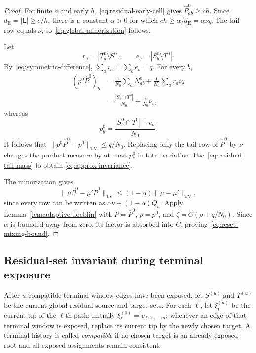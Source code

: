 \documentclass[11pt]{article}
\newcommand{\1}{\mathbf 1}
\newcommand{\TV}{\mathrm{TV}}
\theoremstyle{definition}
\theoremstyle{remark}
\begin{document}
\begin{proof}
For finite $a$ and early $b$,~\eqref{eq:residual-early-cell} gives
$\widehat P^0_{ab}\geq ch$.  Since
$d_{\mathrm E}=|\mathsf E|\geq c/h$, there is a constant $\alpha>0$ for
which $ch\geq\alpha/d_{\mathrm E}=\alpha\nu_b$.  The tail row equals
$\nu$, so~\eqref{eq:global-minorization} follows.

Let
\[
 r_a=|T_a^0\setminus S^0|,
 \qquad
 e_b=|S_b^0\setminus T^0|.
\]
By~\eqref{eq:symmetric-difference}, $\sum_ar_a=\sum_be_b=q$.  For every
$b$,
\begin{align*}
 (p^0\widehat P^0)_b
 &=\frac1{N_0}\sum_aN_{ab}^0
   +\frac1{N_0}\sum_ar_a\nu_b\\
 &=\frac{|S_b^0\cap T^0|}{N_0}+\frac{q}{N_0}\nu_b,
\end{align*}
whereas
\[
  p_b^0=\frac{|S_b^0\cap T^0|+e_b}{N_0}.
\]
It follows that
$\|p^0\widehat P^0-p^0\|_{\TV}\leq q/N_0$.  Replacing only the tail row
of $\widehat P^0$ by $\nu$ changes the product measure by at most
$p_*^0$ in total variation.  Use~\eqref{eq:residual-tail-mass} to obtain
\eqref{eq:approx-invariance}.

The minorization gives
\begin{equation}\label{eq:doeblin-contraction}
 \|\mu\overline P^0-\mu'\overline P^0\|_{\TV}
 \leq(1-\alpha)\|\mu-\mu'\|_{\TV},
\end{equation}
since every row can be written as
$\alpha\nu+(1-\alpha)Q_a$.  Apply
Lemma~\ref{lem:adaptive-doeblin} with
$P=\overline P^0$, $p=p^0$, and
$\zeta=C(\rho+q/N_0)$.  Since $\alpha$ is bounded away from zero, its
factor is absorbed into $C$, proving~\eqref{eq:reset-mixing-bound}.
\end{proof}

\subsection{Residual-set invariant during terminal exposure}

After $u$ compatible terminal-window edges have been exposed, let
$S^{(u)}$ and $T^{(u)}$ be the current global residual source and target
sets.  For each $\ell$, let $\xi_\ell^{(u)}$ be the current tip of the
$\ell$th path: initially
$\xi_\ell^{(0)}=v_{\ell,r_\ell-m}$; whenever an edge of that terminal
window is exposed, replace its current tip by the newly chosen target.
A terminal history is called \emph{compatible} if no chosen target is an
already exposed root and all exposed assignments remain consistent.
\end{document}
